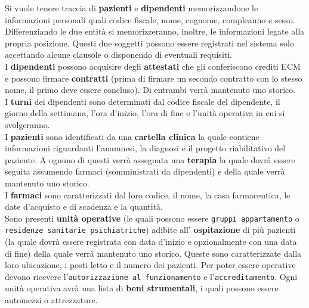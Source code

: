 \documentclass[a4paper, 12pt]{report}
\newenvironment{changemargin}[2]{%
  \begin{list}{}{%
    \setlength{\topsep}{0pt}%
    \setlength{\leftmargin}{#1}%
    \setlength{\rightmargin}{#2}%
    \setlength{\listparindent}{\parindent}%
    \setlength{\itemindent}{\parindent}%
    \setlength{\parsep}{\parskip}%
  }%
  \item[]}{\end{list}}
\begin{document}
\begin{changemargin}{0.5cm}{0.5cm}
        \noindent
        Si vuole tenere traccia di \textbf{pazienti} e \textbf{dipendenti} memorizzandone le informazioni personali
        quali codice fiscale, nome, cognome, compleanno e sesso.
        Differenziando le due entità si memorizzeranno, inoltre, le informazioni legate alla propria posizione.
        Questi due soggetti possono essere registrati nel sistema solo accettando alcune clausole o
        disponendo di eventuali requisiti.\\
        I \textbf{dipendenti} possono acquisire degli \textbf{attestati} che gli conferiscono crediti ECM e possono firmare
        \textbf{contratti} (prima di firmare un secondo contratto con lo stesso nome, il primo deve essere concluso).
        Di entrambi verrà mantenuto uno storico.\\
        I \textbf{turni} dei dipendenti sono determinati dal codice fiscale del dipendente, il giorno della settimana, 
        l'ora d'inizio, l'ora di fine e l'unità operativa in cui si svolgeranno.\\
        I \textbf{pazienti} sono identificati da una \textbf{cartella clinica} la quale contiene informazioni riguardanti
        l'anamnesi, la diagnosi e il progetto riabilitativo del paziente. A ognuno di questi verrà assegnata una 
        \textbf{terapia} la quale dovrà essere seguita assumendo farmaci (somministrati da dipendenti) e della quale
        verrà mantenuto uno storico.\\
        I \textbf{farmaci} sono caratterizzati dal loro codice, il nome, la casa farmaceutica, le date d'acquisto e
        di scadenza e la quantità.\\
        Sono presenti \textbf{unità operative} (le quali possono essere \texttt{gruppi appartamento} o \texttt{residenze
        sanitarie psichiatriche}) adibite all' \textbf{ospitazione} di più pazienti (la quale dovrà essere registrata
        con data d'inizio e opzionalmente con una data di fine) della quale verrà mantenuto uno storico.
        Queste sono caratterizzate dalla loro ubicazione, i posti letto e il numero dei pazienti.
        Per poter essere operative devono ricevere l'\texttt{autorizzazione al funzionamento} e l'\texttt{accreditamento}.
        Ogni unità operativa avrà una lista di \textbf{beni strumentali}, i quali possono essere automezzi o attrezzature.
\end{changemargin}
\end{document}

